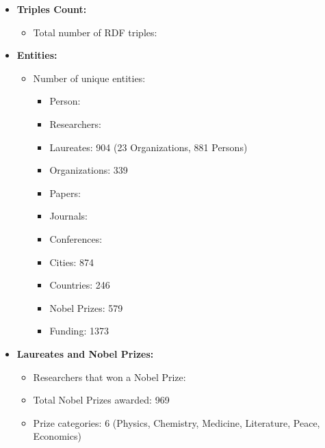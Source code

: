 \documentclass{article}
\begin{document}
\begin{itemize}
	\item	\textbf{Triples Count:}
				\begin{itemize}
				\item Total number of RDF triples: %
				\end{itemize}
	\item	\textbf{Entities:}
				\begin{itemize}
		      	\item Number of unique entities:
		            \begin{itemize}
			            \item Person: %
			            \item Researchers: %
			            \item Laureates: 904 (23 Organizations, 881 Persons)
			            \item Organizations: 339
			            \item Papers: %
			            \item Journals: %
			            \item Conferences: %
			            \item Cities: 874
			            \item Countries: 246
			            \item Nobel Prizes: 579
			            \item Funding: 1373
		            \end{itemize}
				\end{itemize}

	\item \textbf{Laureates and Nobel Prizes:}
	      \begin{itemize}
		      \item Researchers that won a Nobel Prize: %
		      \item Total Nobel Prizes awarded: 969
		      \item Prize categories: 6 (Physics, Chemistry, Medicine, Literature, Peace, Economics)
	      \end{itemize}
\end{itemize}
\end{document}
